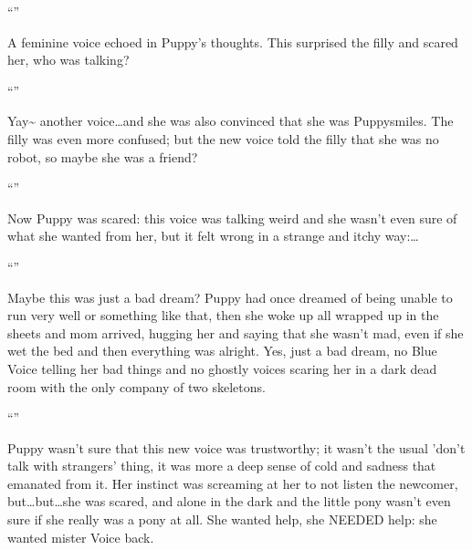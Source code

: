 ``''

A feminine voice echoed in Puppy's thoughts. This surprised the filly and scared her, who was talking?

``''

Yay\textasciitilde{} another voice\dots and she was also convinced that she was Puppysmiles. The filly was even more confused; but the new voice told the filly that she was no robot, so maybe she was a friend?

``''

Now Puppy was scared: this voice was talking weird and she wasn't even sure of what she wanted from her, but it felt wrong in a strange and itchy way:\dots

``''

Maybe this was just a bad dream? Puppy had once dreamed of being unable to run very well or something like that, then she woke up all wrapped up in the sheets and mom arrived, hugging her and saying that she wasn't mad, even if she wet the bed and then everything was alright. Yes, just a bad dream, no Blue Voice telling her bad things and no ghostly voices scaring her in a dark dead room with the only company of two skeletons.

``''

Puppy wasn't sure that this new voice was trustworthy; it wasn't the usual 'don't talk with strangers' thing, it was more a deep sense of cold and sadness that emanated from it. Her instinct was screaming at her to not listen the newcomer, but\dots but\dots she was scared, and alone in the dark and the little pony wasn't even sure if she really was a pony at all. She wanted help, she NEEDED help: she wanted mister Voice back.

